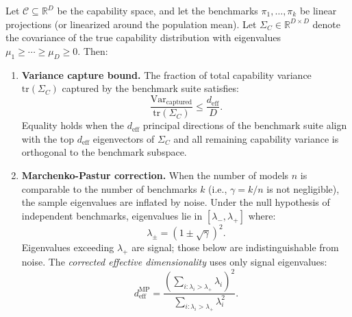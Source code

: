 \begin{theorem}
\label{thm:deff}
Let $\mathcal{C} \subseteq \mathbb{R}^D$ be the capability space, and let the benchmarks $\pi_1, \ldots, \pi_k$ be linear projections (or linearized around the population mean). Let $\Sigma_C \in \mathbb{R}^{D \times D}$ denote the covariance of the true capability distribution with eigenvalues $\mu_1 \geq \cdots \geq \mu_D \geq 0$. Then:

\begin{enumerate}[label=(\alph*)]
  \item \textbf{Variance capture bound.} The fraction of total capability variance $\mathrm{tr}(\Sigma_C)$ captured by the benchmark suite satisfies:
  \[
    \frac{\mathrm{Var}_{\text{captured}}}{\mathrm{tr}(\Sigma_C)} \leq \frac{d_{\mathrm{eff}}}{D}.
  \]
  Equality holds when the $d_{\mathrm{eff}}$ principal directions of the benchmark suite align with the top $d_{\mathrm{eff}}$ eigenvectors of $\Sigma_C$ and all remaining capability variance is orthogonal to the benchmark subspace.

  \item \textbf{Marchenko-Pastur correction.} When the number of models $n$ is comparable to the number of benchmarks $k$ (i.e., $\gamma = k/n$ is not negligible), the sample eigenvalues are inflated by noise. Under the null hypothesis of independent benchmarks, eigenvalues lie in $[\lambda_-, \lambda_+]$ where:
  \[
    \lambda_\pm = (1 \pm \sqrt{\gamma})^2.
  \]
  Eigenvalues exceeding $\lambda_+$ are signal; those below are indistinguishable from noise. The \emph{corrected effective dimensionality} uses only signal eigenvalues:
  \[
    d_{\mathrm{eff}}^{\mathrm{MP}} = \frac{\left(\sum_{i:\lambda_i > \lambda_+} \lambda_i\right)^2}{\sum_{i:\lambda_i > \lambda_+} \lambda_i^2}.
  \]
\end{enumerate}
\end{theorem}

